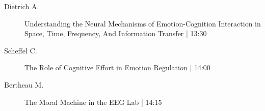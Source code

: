 \begin{symposium}
\begin{description}
                \item [ Dietrich A.] Understanding the Neural Mechanisms of Emotion-Cognition Interaction in Space, Time, Frequency, And Information Transfer \textcolor{mygray}{ | 13:30}    
                
                \item [ Scheffel C.] The Role of Cognitive Effort in Emotion Regulation \textcolor{mygray}{ | 14:00}    
                
                \item [ Bertheau M.] The Moral Machine in the EEG Lab \textcolor{mygray}{ | 14:15}    
                
            \end{description} 
            \end{symposium}
            